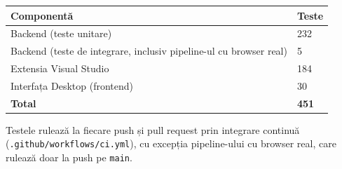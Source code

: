 \documentclass[12pt,a4paper]{report}
\newcommand{\File}[1]{\nolinkurl{#1}}
\begin{document}
\begin{tabularx}{\textwidth}{@{}p{6.5cm}Y@{}}
\toprule \textbf{Componentă} & \textbf{Teste} \\
\midrule
Backend (teste unitare) & 232 \\
Backend (teste de integrare, inclusiv pipeline-ul cu browser real) & 5 \\
Extensia Visual Studio & 184 \\
Interfața Desktop (frontend) & 30 \\
\midrule
\textbf{Total} & \textbf{451} \\
\bottomrule
\end{tabularx}

Testele rulează la fiecare push și pull request prin integrare continuă (\File{.github/workflows/ci.yml}), cu excepția pipeline-ului cu browser real, care rulează doar la push pe \File{main}.
\end{document}
